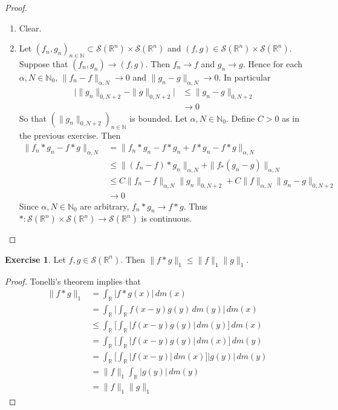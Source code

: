 \documentclass[12pt]{amsart}
\theoremstyle{definition}
\newtheorem{ex}[definition]{Exercise}
\newcommand{\al}{\alpha}
\newcommand{\N}{\mathbb{N}}
\newcommand{\R}{\mathbb{R}}
\newcommand{\MS}{\mathcal{S}}
\newcommand{\dm}{\, d m}
\begin{document}
	\begin{proof}\
		\begin{enumerate}
			\item Clear.
			\item Let $(f_n,g_n)_{n \in \N} \subset \MS(\R^n) \times \MS(\R^n)$ and $(f,g) \in \MS(\R^n) \times \MS(\R^n)$. Suppose that $(f_n, g_n) \rightarrow (f,g)$. Then $f_n \rightarrow f$ and $g_n \rightarrow g$. Hence for each $\al, N \in \N_0$, $\|f_n - f\|_{\al, N} \rightarrow 0$ and $\|g_n - g\|_{\al, N} \rightarrow 0$. In particular 
			\begin{align*}
				\bigg|\|g_n\|_{0,N+2} - \|g\|_{0, N+2} \bigg| 
				& \leq \|g_n - g\|_{0, N+2}  \\
				& \rightarrow 0
			\end{align*}
			So that $(\|g_n\|_{0,N+2})_{n \in \N}$ is bounded.
			Let $\al,N \in \N_0$. Define $C >0$ as in the previous exercise. Then 
			\begin{align*}
				\|f_n *g_n - f*g\|_{\al,N} 
				& = \|f_n *g_n - f*g_n + f*g_n - f*g\|_{\al,N} \\ 
				& \leq \|(f_n -f )*g_n\|_{\al,N} + \|f_ *(g_n -g)\|_{\al,N} \\
				& \leq C\|f_n -f\|_{\al,N}\|g_n\|_{0, N+2} + C\|f\|_{\al,N}\|g_n-g\|_{0, N+2} \\
				& \rightarrow 0
			\end{align*}
			Since $\al,N \in \N_0$ are arbitrary, $f_n *g_n \rightarrow f*g$. Thus $*:\MS(\R^n) \times \MS(\R^n) \rightarrow \MS(\R^n)$ is continuous.
		\end{enumerate}
	\end{proof}

	\begin{ex}
		Let $f,g \in \MS(\R^n)$. Then $\|f*g\|_1 \leq \|f\|_1\|g\|_1$.
	\end{ex}

	\begin{proof}
		Tonelli's theorem implies that 
		\begin{align*}
			\|f*g\|_1
			& = \int_{\R} |f*g(x)| \dm(x) \\
			& = \int_{\R}  \bigg|\int_{\R} f(x-y)g(y) \dm(y) \bigg|  \dm(x) \\
			& \leq  \int_{\R} \bigg[ \int_{\R} |f(x-y)g(y)| \dm(y) \bigg] \dm(x) \\
			& = \int_{\R} \bigg[ \int_{\R} |f(x-y)g(y)| \dm(x) \bigg] \dm(y) \\
			& = \int_{\R} \bigg[ \int_{\R} |f(x-y)| \dm(x) \bigg] |g(y)| \dm(y) \\
			& = \|f\|_1 \int_{\R} |g(y)| \dm(y) \\
			& = \|f\|_1\|g\|_1
		\end{align*}
	\end{proof}
\end{document}
